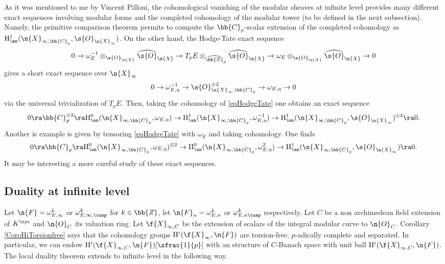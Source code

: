 \begin{remark}
As it was mentioned to me by Vincent Pilloni, the cohomological vanishing of the modular sheaves at infinite level provides many different exact sequences involving modular forms and the completed cohomology of the modular tower (to be defined in the next subsection). Namely, the primitive comparison theorem permits to compute the $\bb{C}_p$-scalar extension of the completed cohomology as $\mathrm{H}_{\an}^1(\n{X}_{\infty,\bb{C}_p}, \s{O}_{\n{X}_\infty})$. On the other hand, the Hodge-Tate exact sequence
\[
0\to \omega_E^{-1} \otimes_{\s{O}_{\n{X}}} \widehat{\s{O}}_{\n{X}} \to T_pE \otimes_{\widehat{\bb{Z}}_p} \widehat{\s{O}}_{\n{X}} \to \omega_E\otimes_{\s{O}_{\n{X}}}\widehat{\s{O}}_{\n{X}} \to 0
\]
gives a short exact sequence over $\n{X}_{\infty}$
\begin{equation}
\label{eqHodgeTate}
0\to \omega^{-1}_{E,\eta } \to \s{O}_{\n{X}_\infty,\bb{C}_p}^{\oplus 2} \to \omega_{E,\eta} \to 0
\end{equation}
via the universal trivialization of $T_pE$. Then, taking the cohomology of \eqref{eqHodgeTate} one obtains an exact sequence
\[
0\ra \bb{C}_p^{\oplus 2}\ra \mathrm{H}_{\an}^0(\n{X}_{\infty,\bb{C}_p}, \omega_{E,\eta}) \to \mathrm{H}_{\an}^1(\n{X}_{\infty,\bb{C}_p}, \omega_{E,\eta}^{-1}) \to \mathrm{H}_{\an}^1(\n{X}_{\infty,\bb{C}_p} , \s{O}_{\n{X}_{\infty}})^{\oplus 2}\ra 0.
\]
Another is example is given by tensoring \eqref{eqHodgeTate} with $\omega_{E}$ and taking cohomology. One finds
\[
0\ra \bb{C}_p \ra \mathrm{H}_{\an}^0(\n{X}_{\infty,\bb{C}_p}, \omega_{E,\eta})^{\oplus 2} \to \mathrm{H}_{\an}^0(\n{X}_{\infty,\bb{C}_p}, \omega_{E,\eta}^{2}) \to \mathrm{H}_{\an}^1(\n{X}_{\infty,\bb{C}_p} , \s{O}_{\n{X}_{\infty}}) \ra 0.
\]
It may be interesting a more careful study of these exact sequences.
\end{remark}

\subsection*{Duality at infinite level}

Let $\n{F}=\omega^k_{E,\infty}$ or $\omega^{k}_{E,\infty,\cusp}$ for $k\in \bb{Z}$, let $\n{F}_n= \omega^k_{E,n}$ or $\omega^k_{E,n \cusp}$ respectively. Let $C$ be a non archimedean field extension of $K^{\cyc}$ and $\n{O}_C$ its valuation ring. Let $\f{X}_{\infty,C}$ be the extension of scalars of the integral modular curve to $\n{O}_C$. Corollary \ref{CoroHiTorsionfree} says that the cohomology groups $\mathrm{H}^i(\f{X}_{\infty}, \n{F})$ are torsion-free, $p$-adically complete and separated. In particular, we can endow $\mathrm{H}^i(\f{X}_{\infty, C}, \n{F})[\sfrac{1}{p}]$ with an structure of $C$-Banach space with unit ball $\mathrm{H}^i(\f{X}_{\infty,C}, \n{F})$. The local duality theorem extends to infinite level in the following way.

